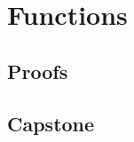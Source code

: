 \chapter{Functions}
\label{ch:functions}

\LRAExcludeFromPrintEditionBegin
\section*{Proofs}

\section*{Capstone}

\LRAExcludeFromPrintEditionEnd
